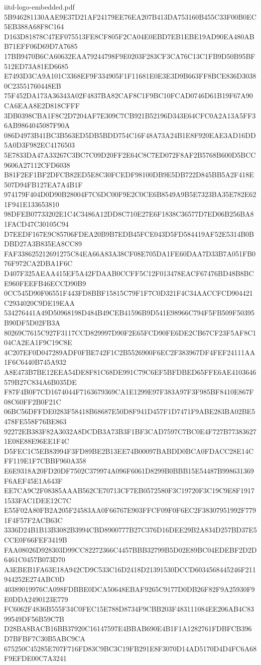 \begin{filecontents*}[overwrite]{iitd-logo-embedded.pdf}
5B946281130AAE9E37D21AF24179EE76EA207B413DA753160B455C33F00B0EC5EB388A68F8C164
D163D81878C47EF075513FE8CF805F2CA04E0EBD7EB1EBE19AD90EA480ABB71EFF06D69D7A7685
17BB9470B6CA60632EAA79244798F9E0203F283CF3CA76C13C1FB9D50B95BF512ED73A81ED6685
E7493D3CA9A101C3368EF9F334905F1F11681E0E3E3D9B663FF8BCE836D30380C23551760448EB
75F452DA173A36343A02F4837BA82CAF8C1F9BC10FCAD0746D61B19F67A90CA6EAA8E2D818CFFF
3DB0398CBA1F8C2D7204AF7E309C7CB921B52196D343E64CFC0A2A13A5FF36AB9864045087F90A
086D4973B41BC3B563ED5DB5BDD754C16F48A73A24B1E8F920EAE3AD16DD5A0D3F982EC4176503
5E7833DA47A33267C3BC7C09D20FF2E64C8C7ED072F8AF2B5768B600D5BCC9606A27112CFD6038
B81F2EF1BF2DFCB82ED5E8C30FCEDF98100DB9E5DB722D845BB5A2F418E507D94FB127EA7A4B1F
974179F404D0D90B28004F7C6DC00F9E2C0CE6B8549A9B5E7323BA35E782E621F941E133653810
98DFEB07733202E1C4C3486A12DD8C710E27E6F1838C36577D7ED06B256BA81FACD47C30105C94
D7EEDF167E9C85706FDEA20B9B7EDB45FCE043D5FD584419AF52E5314B0BDBD27A3B835EA8CC89
FAF338625212691275C84EA66A83A38CF08E705DA1FE60DAA7D33B7A051FB076F972CA2DBA1F6C
D407F325AEAA415EF5A42FDAAB0CCFF5C12F013478EACF67476BD48B8BCE960FEEFB46ECCD90B9
0CC545D90F06551F443FD8BBF15815C79F1F7C0D321F4C34AACCFCD904421C2934020C9DE19EAA
534276441A49D50968198D484B49CEB41596B9D541E98966C794F5FB509F50395B90DF5D02FB3A
80269C7615C927F3117CCD829997D90F2E65FCD90FE6DE2CB67CF23F5AF8C104CA2EA1F9C19C8E
4C207EF0D047289ADF0FBE742F1C2B5526900F6EC2F383967DF4FEF24111AA1F6C6440B745A932
A8E473B7BE12EEA54DE8F81C68DE991C79C6EF5BFDBED65FFE6AE4103646579B27C834A6B035DE
F87F4B0F7CD1674044F7163679369CA1E1299E97F383A97F3F985BF8410E867F08C60FF2B0F21C
06BC56DFFDE0283F58418B68687E50D8F941D457F1D7471F9ABE283BA02BE5478FE558F76BE863
92272EB383F82A3032A8DCDB3A73B3F1BF3CAD7597C7BC0E4F727B773836271E08E88E96EE1F4C
D5FEC1C5EB83994F3FD89BE2B13EE74B00097BABDD0BCA0FDACC28E14CFF119E1F7CBBF960A358
E6E9318A20FD20DF7502C379974A096F6061D8299B0BBB15E54487B998631369F6AEF45E1A643F
EE7CA9C2F08385AAAB562CE70713CF7EB0572580F3C19720F3C19C9E8F19171533FAC1DEE12C7C
E55F02A80FB2A205F24583AA0F66767E903FFCF09F0F6EC2F38307951992F7791F4F57F2ACB63C
3336D24B1B13B3082B3994CBD8900777B27C376D16DEE29B2A834D257BD37E5CCE0F66FEF3419B
FAA08026D928303D99CC82272366C4457BBB32799B5D02E89BC04EDEBF2D2D6461C0457B073D70
A3EBEB1FA63E18A942CD9C533C16D2418D21391530DCCD6034568445246F211944252E274ABC0D
40389019976CA098FDBBE0DCA50648EBAF9265C9177D0DB26F82F9A25930F9E0DDA2490123E779
FC6062F4836B555F34C0FEC15E788D8734F9CBB203F483111084EE206AB4C8399549DF56B59C7B
D28BA8BACB16BB37920C16147597E4BBAB690E4B1F1A1282761FDBFCB396D7BFBF7C30B5ABC9CA
675250C45285E707F716FD83C9BC3C19FB291E8F3070D14AD5170D4D4FC6A68F9EFDE00C7A3241

\end{filecontents*}
